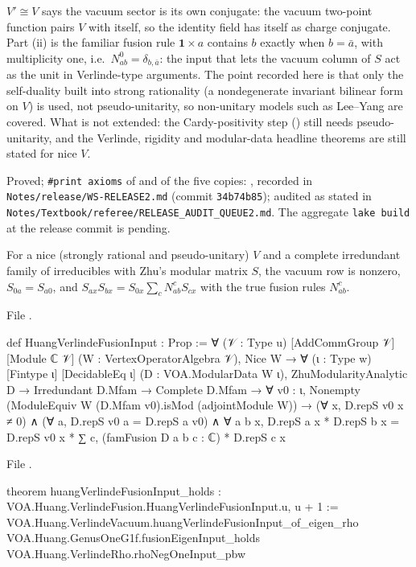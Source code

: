 \begin{physics}
$V'\cong V$ says the vacuum sector is its own conjugate: the vacuum two-point function pairs $V$ with itself, so the
identity field has itself as charge conjugate. Part (ii) is the familiar fusion rule $\mathbf 1\times a$ contains $b$
exactly when $b=\bar a$, with multiplicity one, i.e.\ $N_{ab}^{0}=\delta_{b,\bar a}$: the input that lets the vacuum column of
$S$ act as the unit in Verlinde-type arguments. The point recorded here is that only the self-duality built into strong
rationality (a nondegenerate invariant bilinear form on $V$) is used, not pseudo-unitarity, so non-unitary models such as
Lee--Yang are covered. What is not extended: the Cardy-positivity step (\allowbreak{})
still needs pseudo-unitarity, and the Verlinde, rigidity and modular-data headline theorems are still stated for nice $V$.
\end{physics}

\begin{status}
Proved; \texttt{\#print axioms} of  and of the five copies:
\lean{[propext, Classical.}\allowbreak{}\allowbreak\lean{sound]}, recorded in
\texttt{Notes/\allowbreak release/\allowbreak WS-RELEASE2.md} (commit \texttt{34b74b85}); audited as stated in
\texttt{Notes/\allowbreak Textbook/\allowbreak referee/\allowbreak RELEASE\_AUDIT\_QUEUE2.md}. The aggregate
\texttt{lake build} at the release commit is pending.
\end{status}

\begin{definition}\label{l21:def:verlinde}
For a nice (strongly rational and pseudo-unitary) $V$ and a complete irredundant family of irreducibles with Zhu's modular matrix $S$, the vacuum row is nonzero,
$S_{0a}=S_{a0}$, and $S_{ax}S_{bx}=S_{0x}\sum_cN_{ab}^cS_{cx}$ with the true fusion rules $N_{ab}^c$.
\end{definition}
\noindent File .
\begin{leancode}
def HuangVerlindeFusionInput : Prop :=
  ∀ (𝒱 : Type u) [AddCommGroup 𝒱] [Module ℂ 𝒱] (W : VertexOperatorAlgebra 𝒱), Nice W →
    ∀ (ι : Type w) [Fintype ι] [DecidableEq ι] (D : VOA.ModularData W ι),
      ZhuModularityAnalytic D → Irredundant D.Mfam → Complete D.Mfam →
      ∀ v0 : ι, Nonempty (ModuleEquiv W (D.Mfam v0).isMod (adjointModule W)) →
        (∀ x, D.repS v0 x ≠ 0) ∧ (∀ a, D.repS v0 a = D.repS a v0) ∧
        ∀ a b x, D.repS a x * D.repS b x
          = D.repS v0 x * ∑ c, (famFusion D a b c : ℂ) * D.repS c x
\end{leancode}
\noindent File .
\begin{leancode}
theorem huangVerlindeFusionInput_holds : VOA.Huang.VerlindeFusion.HuangVerlindeFusionInput.{u, u + 1} :=
  VOA.Huang.VerlindeVacuum.huangVerlindeFusionInput_of_eigen_rho
    VOA.Huang.GenusOneG1f.fusionEigenInput_holds VOA.Huang.VerlindeRho.rhoNegOneInput_pbw
\end{leancode}

